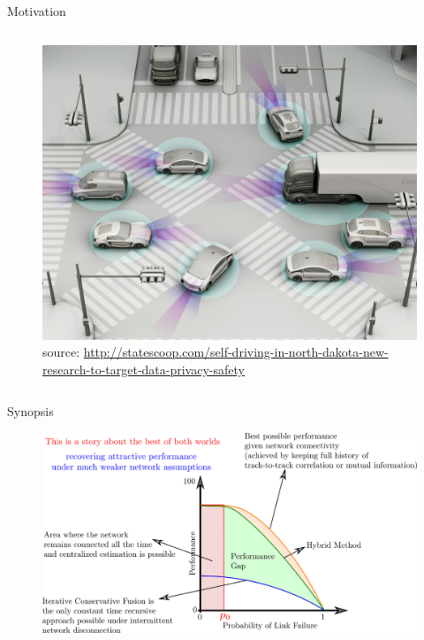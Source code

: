 \documentclass{beamer}
\theoremstyle{remark}
\begin{document}
\begin{frame}{Motivation}
\begin{columns}
	\begin{column}{.34\textwidth}
		\begin{figure}
			\centering
			\includegraphics[width=1\linewidth]{sdc.jpg}
			\caption*{\tiny source: \href{http://statescoop.com/self-driving-in-north-dakota-new-research-to-target-data-privacy-safety}{\tiny http://statescoop.com/self-driving-in-north-dakota-new-research-to-target-data-privacy-safety}}
		\end{figure}
	\end{column}
\end{columns}




%
\end{frame}
\begin{frame}{Synopsis}
			\begin{figure}
				\centering
	 			\includegraphics[width=1\linewidth]{synopsis5.png}
			\end{figure}
	

\end{frame}
\end{document}
